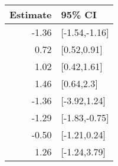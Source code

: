 \begin{tabular}{rl}
  \hline
Estimate & 95\% CI \\ 
  \hline
-1.36 & [-1.54,-1.16] \\ 
  0.72 & [0.52,0.91] \\ 
  1.02 & [0.42,1.61] \\ 
  1.46 & [0.64,2.3] \\ 
  -1.36 & [-3.92,1.24] \\ 
  -1.29 & [-1.83,-0.75] \\ 
  -0.50 & [-1.21,0.24] \\ 
  1.26 & [-1.24,3.79] \\ 
   \hline
\end{tabular}

